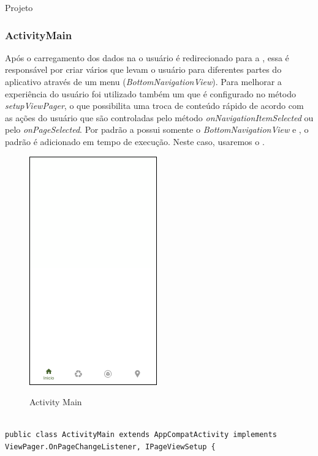 \documentclass[
	12pt,				%
	openright,			%
	twoside,			%
	a4paper,			%
	english,			%
	french,				%
	spanish,			%
	brazil				%
	]{abntex2}
\begin{document}
\begin{chapter}{Projeto}
\subsubsection{ActivityMain} \label{main_activity}
Após o carregamento dos dados na  o usuário é redirecionado para a , essa  é responsável por criar vários  que levam o usuário para diferentes partes do aplicativo através de um menu (\textit{BottomNavigationView}). Para melhorar a experiência do usuário foi utilizado também um  que é configurado no método \textit{setupViewPager}, o que possibilita uma troca de conteúdo rápido de acordo com as ações do usuário que são controladas pelo método \textit{onNavigationItemSelected} ou pelo \textit{onPageSelected}. Por padrão a  possui somente o \textit{BottomNavigationView} e , o  padrão é adicionado em tempo de execução. Neste caso, usaremos o .

\newpage

\begin{figure}[h]
\centering
   \caption{Activity Main}
   \includegraphics[scale=1.0]{media/activity_main.png}
     \label{fig:activity_main_app}
\end{figure}


\begin{lstlisting}[numbers=none,
basicstyle=\small,
caption={MainActivity.java},
title={MainActivity.java},
label={MainActivity.java}]

public class ActivityMain extends AppCompatActivity implements ViewPager.OnPageChangeListener, IPageViewSetup {



\end{lstlisting}
\end{chapter}
\end{document}
